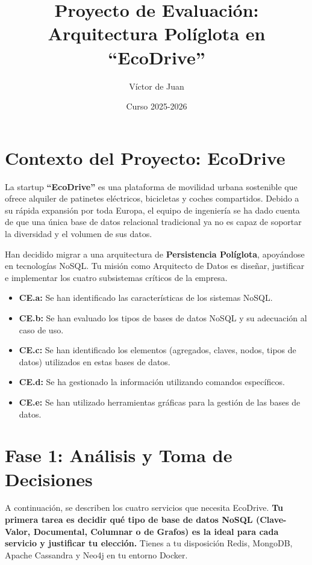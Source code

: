 \documentclass[12pt,a4paper]{article}
\title{\textbf{Proyecto de Evaluación: Arquitectura Políglota en \enquote{EcoDrive}}}
\author{Víctor de Juan}
\date{Curso 2025-2026}
\begin{document}
\maketitle

\section{Contexto del Proyecto: EcoDrive}
La startup \textbf{\enquote{EcoDrive}} es una plataforma de movilidad urbana sostenible que ofrece alquiler de patinetes eléctricos, bicicletas y coches compartidos. Debido a su rápida expansión por toda Europa, el equipo de ingeniería se ha dado cuenta de que una única base de datos relacional tradicional ya no es capaz de soportar la diversidad y el volumen de sus datos.

Han decidido migrar a una arquitectura de \textbf{Persistencia Políglota}, apoyándose en tecnologías NoSQL. Tu misión como Arquitecto de Datos es diseñar, justificar e implementar los cuatro subsistemas críticos de la empresa.

\begin{criterio}
\begin{itemize}
    \item \textbf{CE.a:} Se han identificado las características de los sistemas NoSQL.
    \item \textbf{CE.b:} Se han evaluado los tipos de bases de datos NoSQL y su adecuación al caso de uso.
    \item \textbf{CE.c:} Se han identificado los elementos (agregados, claves, nodos, tipos de datos) utilizados en estas bases de datos.
    \item \textbf{CE.d:} Se ha gestionado la información utilizando comandos específicos.
    \item \textbf{CE.e:} Se han utilizado herramientas gráficas para la gestión de las bases de datos.
\end{itemize}
\end{criterio}

\section{Fase 1: Análisis y Toma de Decisiones}
A continuación, se describen los cuatro servicios que necesita EcoDrive. \textbf{Tu primera tarea es decidir qué tipo de base de datos NoSQL (Clave-Valor, Documental, Columnar o de Grafos) es la ideal para cada servicio y justificar tu elección.} Tienes a tu disposición Redis, MongoDB, Apache Cassandra y Neo4j en tu entorno Docker.
\end{document}
